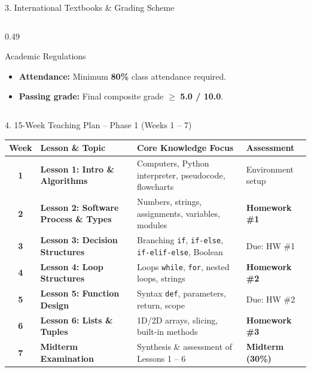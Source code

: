 \documentclass[aspectratio=169, 10pt]{beamer}
\begin{document}
\begin{frame}{3. International Textbooks \& Grading Scheme}
\begin{columns}[T]
\begin{column}{0.49\textwidth}
      \begin{cbox}[accentorange]{Academic Regulations}
        \footnotesize
        \begin{itemize}\setlength{\itemsep}{2pt}
          \item \textbf{Attendance:} Minimum \textbf{80\%} class attendance required.
          \item \textbf{Passing grade:} Final composite grade $\ge$ \textbf{5.0 / 10.0}.
        \end{itemize}
      \end{cbox}
    \end{column}
  \end{columns}
\end{frame}

\begin{frame}{4. 15-Week Teaching Plan -- Phase 1 (Weeks 1 -- 7)}
  \scriptsize
  \begin{tabularx}{\textwidth}{c l X l}
    \toprule
    \textbf{Week} & \textbf{Lesson \& Topic} & \textbf{Core Knowledge Focus} & \textbf{Assessment} \\
    \midrule
    \textbf{1} & \textbf{Lesson 1: Intro \& Algorithms} & Computers, Python interpreter, pseudocode, flowcharts & Environment setup \\
    \textbf{2} & \textbf{Lesson 2: Software Process \& Types} & Numbers, strings, assignments, variables, modules & \textbf{Homework \#1} \\
    \textbf{3} & \textbf{Lesson 3: Decision Structures} & Branching \texttt{if}, \texttt{if-else}, \texttt{if-elif-else}, Boolean & Due: HW \#1 \\
    \textbf{4} & \textbf{Lesson 4: Loop Structures} & Loops \texttt{while}, \texttt{for}, nested loops, strings & \textbf{Homework \#2} \\
    \textbf{5} & \textbf{Lesson 5: Function Design} & Syntax \texttt{def}, parameters, return, scope & Due: HW \#2 \\
    \textbf{6} & \textbf{Lesson 6: Lists \& Tuples} & 1D/2D arrays, slicing, built-in methods & \textbf{Homework \#3} \\
    \textbf{7} & \textbf{Midterm Examination} & Synthesis \& assessment of Lessons 1 -- 6 & \textbf{Midterm (30\%)} \\
    \bottomrule
  \end{tabularx}
\end{frame}
\end{document}
